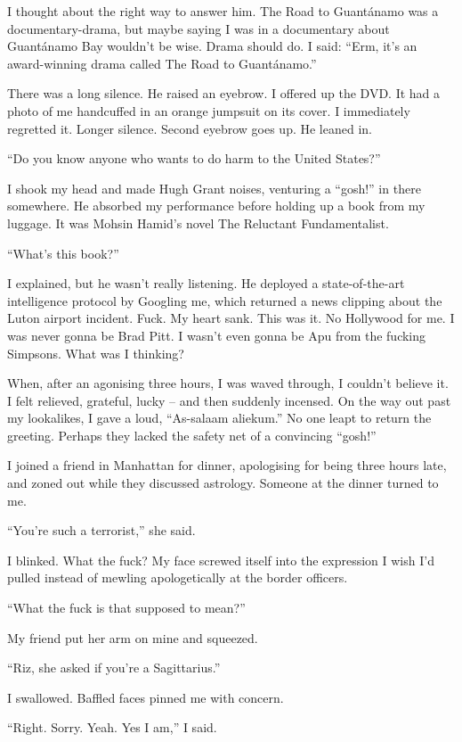 \documentclass[10pt,a4paper]{article}
\begin{document}
I thought about the right way to answer him. The Road to Guantánamo was a documentary-drama, but maybe saying I was in a documentary about Guantánamo Bay wouldn’t be wise. Drama should do. I said: “Erm, it’s an award-winning drama called The Road to Guantánamo.”

There was a long silence. He raised an eyebrow. I offered up the DVD. It had a photo of me handcuffed in an orange jumpsuit on its cover. I immediately regretted it. Longer silence. Second eyebrow goes up. He leaned in.

“Do you know anyone who wants to do harm to the United States?”

I shook my head and made Hugh Grant noises, venturing a “gosh!” in there somewhere. He absorbed my performance before holding up a book from my luggage. It was Mohsin Hamid’s novel The Reluctant Fundamentalist.

“What’s this book?”

I explained, but he wasn’t really listening. He deployed a state-of-the-art intelligence protocol by Googling me, which returned a news clipping about the Luton airport incident. Fuck. My heart sank. This was it. No Hollywood for me. I was never gonna be Brad Pitt. I wasn’t even gonna be Apu from the fucking Simpsons. What was I thinking?

When, after an agonising three hours, I was waved through, I couldn’t believe it. I felt relieved, grateful, lucky – and then suddenly incensed. On the way out past my lookalikes, I gave a loud, “As-salaam aliekum.” No one leapt to return the greeting. Perhaps they lacked the safety net of a convincing “gosh!”

I joined a friend in Manhattan for dinner, apologising for being three hours late, and zoned out while they discussed astrology. Someone at the dinner turned to me.

“You’re such a terrorist,” she said.

I blinked. What the fuck? My face screwed itself into the expression I wish I’d pulled instead of mewling apologetically at the border officers.

“What the fuck is that supposed to mean?”

My friend put her arm on mine and squeezed.

“Riz, she asked if you’re a Sagittarius.”

I swallowed. Baffled faces pinned me with concern.

“Right. Sorry. Yeah. Yes I am,” I said.
\end{document}
